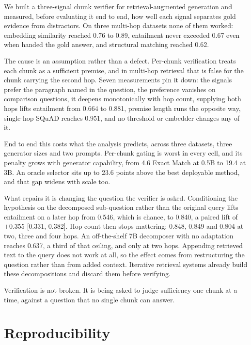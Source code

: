 \documentclass[conference]{IEEEtran}
\begin{document}
We built a three-signal chunk verifier for retrieval-augmented generation and
measured, before evaluating it end to end, how well each signal separates gold
evidence from distractors. On three multi-hop datasets none of them worked:
embedding similarity reached 0.76 to 0.89, entailment never exceeded 0.67 even
when handed the gold answer, and structural matching reached 0.62.

The cause is an assumption rather than a defect. Per-chunk verification treats
each chunk as a sufficient premise, and in multi-hop retrieval that is false for
the chunk carrying the second hop. Seven measurements pin it down: the signals
prefer the paragraph named in the question, the preference vanishes on
comparison questions, it deepens monotonically with hop count, supplying both
hops lifts entailment from 0.664 to 0.881, premise length runs the opposite way,
single-hop SQuAD reaches 0.951, and no threshold or embedder changes any of it.

End to end this costs what the analysis predicts, across three datasets, three
generator sizes and two prompts. Per-chunk gating is worst in every cell, and its
penalty grows with generator capability, from 4.6 Exact Match at 0.5B to 19.4 at
3B. An oracle selector sits up to 23.6 points above the best deployable method,
and that gap widens with scale too.

What repairs it is changing the question the verifier is asked. Conditioning the
hypothesis on the decomposed sub-question rather than the original query lifts
entailment on a later hop from 0.546, which is chance, to 0.840, a paired lift of
$+0.355$ [0.331, 0.382]. Hop count then stops mattering: 0.848, 0.849 and 0.804
at two, three and four hops. An off-the-shelf 7B decomposer with no adaptation
reaches 0.637, a third of that ceiling, and only at two hops. Appending retrieved
text to the query does not work at all, so the effect comes from restructuring
the question rather than from added context. Iterative retrieval systems already
build these decompositions and discard them before verifying.

Verification is not broken. It is being asked to judge sufficiency one chunk at
a time, against a question that no single chunk can answer.

\section*{Reproducibility}
\end{document}
